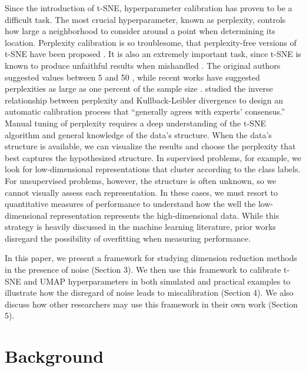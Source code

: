 \documentclass{article}
\begin{document}
Since the introduction of t-SNE, hyperparameter calibration has proven to be a difficult task. The most crucial hyperparameter, known as perplexity, controls how large a neighborhood to consider around a point when determining its location. Perplexity calibration is so troublesome, that perplexity-free versions of t-SNE have been proposed \cite{perplexity-free t-SNE}. It is also an extremely important task, since t-SNE is known to produce unfaithful results when mishandled \cite{evaluation of DR transcriptomics}. The original authors suggested values between 5 and 50 \cite{t-SNE}, while recent works have suggested perplexities as large as one percent of the sample size \cite{t-SNE cell}. \cite{perplexity vs kl} studied the inverse relationship between perplexity and Kullback-Leibler divergence to design an automatic calibration process that ``generally agrees with experts' consensus.'' Manual tuning of perplexity requires a deep understanding of the t-SNE algorithm and general knowledge of the data's structure. When the data's structure is available, we can visualize the results and choose the perplexity that best captures the hypothesized structure. In supervised problems, for example, we look for low-dimensional representations that cluster according to the class labels. For unsupervised problems, however, the structure is often unknown, so we cannot visually assess each representation. In these cases, we must resort to quantitative measures of performance to understand how the well the low-dimensional representation represents the high-dimensional data. While this strategy is heavily discussed in the machine learning literature, prior works disregard the possibility of overfitting when measuring performance.

In this paper, we present a framework for studying dimension reduction methods in the presence of noise (Section 3). We then use this framework to calibrate t-SNE and UMAP hyperparameters in both simulated and practical examples to illustrate how the disregard of noise leads to miscalibration (Section 4). We also discuss how other researchers may use this framework in their own work (Section 5).

\section{Background}
\end{document}
